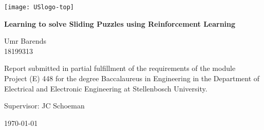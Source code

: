 \graphicspath{{frontmatter/fig/}}

\begin{titlepage}
\begin{center}

\texttt{[image: USlogo-top]}

\vfill

{\sffamily \bfseries \huge Learning to solve Sliding Puzzles
using Reinforcement Learning \par}

\vfill

{\large {\Large Umr Barends} \\ 18199313 \par}

\vfill

\vfill

{Report submitted in partial fulfillment of the requirements of the module \\
Project (E) 448 for the degree Baccalaureus in Engineering in the Department of
Electrical and Electronic Engineering at Stellenbosch University. \par}

\vfill

{\large {Supervisor}: JC Schoeman} %

\vfill

{\Large \today}
\end{center}
\end{titlepage}
